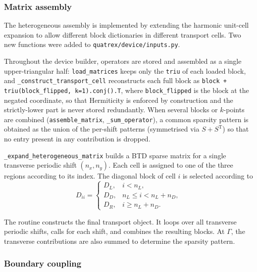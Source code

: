\subsubsection{Matrix assembly}

The heterogeneous assembly is implemented by extending the harmonic
unit-cell expansion to allow different block dictionaries in different
transport cells.  Two new functions were added to
\texttt{quatrex/device/inputs.py}.

Throughout the device builder, operators are stored and assembled as a
single upper-triangular half: \texttt{load\_matrices} keeps only the
\texttt{triu} of each loaded block, and \texttt{\_construct\_transport\_cell}
reconstructs each full block as
\texttt{block + triu(block\_flipped, k=1).conj().T}, where
\texttt{block\_flipped} is the block at the negated coordinate, so that
Hermiticity is enforced by construction and the strictly-lower part is
never stored redundantly.  When several blocks or $k$-points are combined
(\texttt{assemble\_matrix}, \texttt{\_sum\_operator}), a common sparsity
pattern is obtained as the union of the per-shift patterns (symmetrised
via $S + S^\mathrm{T}$) so that no entry present in any contribution is
dropped.

\texttt{\_expand\_heterogeneous\_matrix} builds a BTD sparse matrix for
a single transverse periodic shift $(n_x,n_y)$.  Each cell is assigned
to one of the three regions according to its index.  The diagonal block
of cell $i$ is selected according to
\begin{equation}
  D_{ii} =
  \begin{cases}
    D_L, & i < n_L, \\
    D_D, & n_L \le i < n_L+n_D, \\
    D_R, & i \ge n_L+n_D.
  \end{cases}
\end{equation}

The routine  constructs the final
transport object. It loops over all transverse periodic shifts, calls
 for each shift, and combines the
resulting blocks. At $\Gamma$, the transverse contributions are also
summed to determine the sparsity pattern.

\subsubsection{Boundary coupling}


